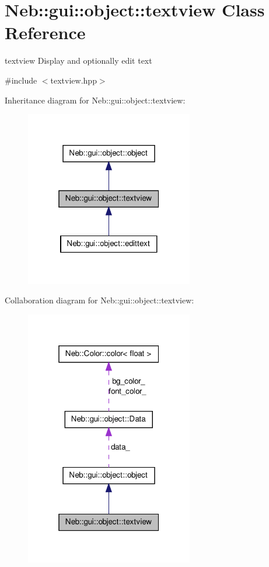 \hypertarget{classNeb_1_1gui_1_1object_1_1textview}{\section{\-Neb\-:\-:gui\-:\-:object\-:\-:textview \-Class \-Reference}
\label{classNeb_1_1gui_1_1object_1_1textview}
}


textview \-Display and optionally edit text  




{\ttfamily \#include $<$textview.\-hpp$>$}



\-Inheritance diagram for \-Neb\-:\-:gui\-:\-:object\-:\-:textview\-:
\nopagebreak
\begin{figure}[H]
\begin{center}
\leavevmode
\includegraphics[width=208pt]{classNeb_1_1gui_1_1object_1_1textview__inherit__graph}
\end{center}
\end{figure}


\-Collaboration diagram for \-Neb\-:\-:gui\-:\-:object\-:\-:textview\-:
\nopagebreak
\begin{figure}[H]
\begin{center}
\leavevmode
\includegraphics[width=208pt]{classNeb_1_1gui_1_1object_1_1textview__coll__graph}
\end{center}
\end{figure}
